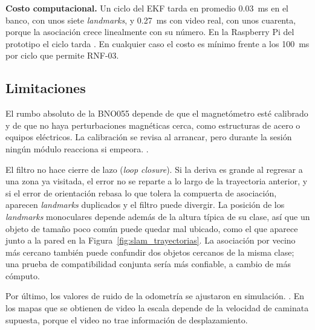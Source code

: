 \textbf{Costo computacional.} Un ciclo del EKF tarda en promedio 0.03~ms en el banco,
con unos siete \emph{landmarks}, y 0.27~ms con video real, con unos cuarenta, porque la
asociación crece linealmente con su número. En la Raspberry Pi del prototipo el ciclo
tarda . En cualquier caso el costo es
mínimo frente a los 100~ms por ciclo que permite RNF-03.

\subsection{Limitaciones}

El rumbo absoluto de la BNO055 depende de que el magnetómetro esté calibrado y de que no
haya perturbaciones magnéticas cerca, como estructuras de acero o equipos eléctricos. La
calibración se revisa al arrancar, pero durante la sesión ningún módulo reacciona si
empeora. .

El filtro no hace cierre de lazo (\emph{loop closure}). Si la deriva es grande al
regresar a una zona ya visitada, el error no se reparte a lo largo de la trayectoria
anterior, y si el error de orientación rebasa lo que tolera la compuerta de asociación,
aparecen \emph{landmarks} duplicados y el filtro puede divergir. La posición de los
\emph{landmarks} monoculares depende además de la altura típica de su clase, así que un
objeto de tamaño poco común puede quedar mal ubicado, como el que aparece junto a la
pared en la Figura~\ref{fig:slam_trayectorias}. La asociación por vecino más cercano
también puede confundir dos objetos cercanos de la misma clase; una prueba de
compatibilidad conjunta \cite{neira2001jcbb} sería más confiable, a cambio de más
cómputo.

Por último, los valores de ruido de la odometría se ajustaron en simulación.
. En los mapas que se obtienen de video la escala depende de
la velocidad de caminata supuesta, porque el video no trae información de
desplazamiento.
